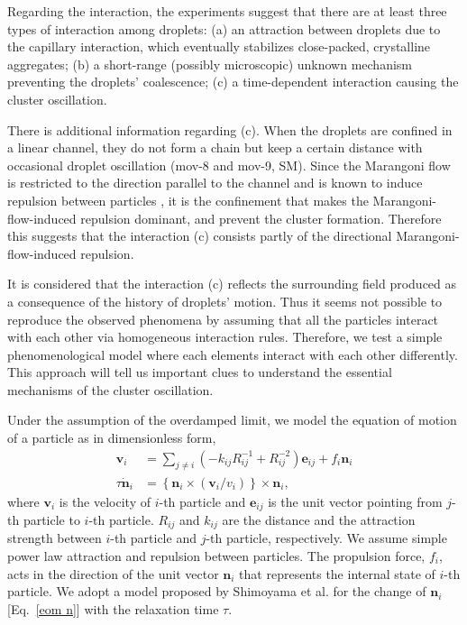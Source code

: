 \documentclass[showpacs]{revtex4-1}
\begin{document}
Regarding the interaction, the experiments suggest that there are at
least three types of interaction among droplets: (a) an attraction
between droplets due to the capillary interaction, which eventually
stabilizes close-packed, crystalline aggregates; (b) a short-range
(possibly microscopic) unknown mechanism preventing the droplets'
coalescence; (c) a time-dependent interaction causing the cluster
oscillation.

There is additional information regarding (c). When the droplets are
confined in a linear channel, they do not form a chain but keep a
certain distance with occasional droplet oscillation (mov-8 and mov-9,
SM). Since the Marangoni flow is restricted to the direction parallel to
the channel and is known to induce repulsion between particles
\cite{Soh2011}, it is the confinement that makes the
Marangoni-flow-induced repulsion dominant, and prevent the cluster
formation. Therefore this suggests that the interaction (c) consists
partly of the directional Marangoni-flow-induced repulsion.

It is considered that the interaction (c)
reflects the surrounding field produced as a consequence of the history
of droplets' motion. Thus it seems not possible to reproduce the
observed phenomena by assuming that all the particles interact with each
other via homogeneous interaction rules. Therefore, we test a
simple phenomenological model where each elements interact with each
other differently. This approach will tell us important clues to
understand the essential mechanisms of the cluster oscillation.

Under the assumption of the overdamped limit, we model the equation of
motion of a particle as in dimensionless form,
 \begin{align}
  \label{eom r}
  \bm{v}_i&=\sum_{j\neq
 i}(-k_{ij}R_{ij}^{-1}+R_{ij}^{-2})\bm{e}_{ij}+f_i\bm{n}_i\\
 \label{eom n}
 \tau\dot{\bm{n}}_i&=\left\{\bm{n}_i \times (\bm{v}_i/v_i)\right\}\times \bm{n}_i,
 \end{align}
where $\bm{v}_i$ is the velocity of $i$-th particle and $\bm{e}_{ij}$ is
the unit vector pointing from $j$-th particle to $i$-th
particle. $R_{ij}$ and $k_{ij}$ are the distance and the attraction
strength between $i$-th particle and $j$-th particle, respectively. We
assume simple power law attraction and repulsion between particles. The
propulsion force, $f_i$, acts in the direction of the unit vector
$\bm{n}_i$ that represents the internal state of $i$-th particle. We
adopt a model proposed by Shimoyama et al. \cite{Shimoyama1996} for the
change of $\bm{n}_i$ [Eq.~\eqref{eom n}] with the relaxation time
$\tau$.
\end{document}
